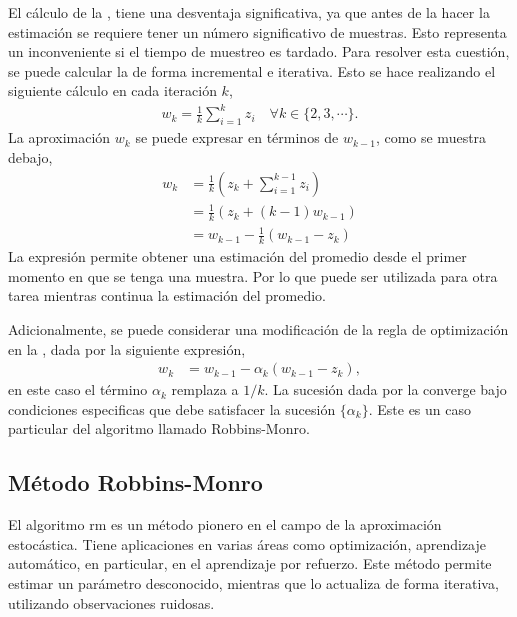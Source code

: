 El cálculo de la , tiene una desventaja significativa, ya que antes de la hacer la estimación se requiere tener un número significativo de muestras. Esto representa un inconveniente si el tiempo de muestreo es tardado. Para resolver esta cuestión, se puede calcular la  de forma incremental e iterativa. Esto se hace realizando el siguiente cálculo en cada iteración $k$,
\begin{align}
    w_{k} = \frac{1}{k}\sum_{i=1}^{k}
    z_i \quad \forall k \in \{2, 3, \cdots\}.
\end{align}
La aproximación $w_{k}$ se puede expresar en términos de $w_{k-1}$, como se muestra debajo,
\begin{equation}
    \begin{aligned}
        w_{k} &= \frac{1}{k}\left(z_{k} + \sum_{i=1}^{k-1}z_{i} \right)\\
        &= \frac{1}{k}(z_{k}+(k-1)w_{k-1}) \\
        &= w_{k-1}-\frac{1}{k}(w_{k-1} -z_{k})
    \end{aligned}
    \label{eq:SA_mean}
\end{equation}
La expresión  permite obtener una estimación del promedio desde el primer momento en que se tenga una muestra. Por lo que puede ser utilizada para otra tarea mientras continua la estimación del promedio.

Adicionalmente, se puede considerar una modificación de la regla de optimización en la , dada por la siguiente expresión,
\begin{align}
    w_{k} &= w_{k-1}-\alpha_{k}(w_{k-1} -z_{k}),
    \label{eq:SA_mean2}
\end{align}
en este caso el término $\alpha_{k}$ remplaza a $1/k$. La sucesión dada por la  converge bajo condiciones especificas que debe satisfacer la sucesión $\{\alpha_{k}\}$. Este es un caso particular del algoritmo llamado Robbins-Monro.

\subsection{Método Robbins-Monro}
\label{sec:RM}
El algoritmo \acrfull{rm} es un método pionero en el campo de la aproximación estocástica. Tiene aplicaciones en varias áreas como optimización, aprendizaje automático, en particular, en el aprendizaje por refuerzo. Este método permite estimar un parámetro desconocido, mientras que lo actualiza de forma iterativa, utilizando observaciones ruidosas. \cite{Shiyu2022} 

